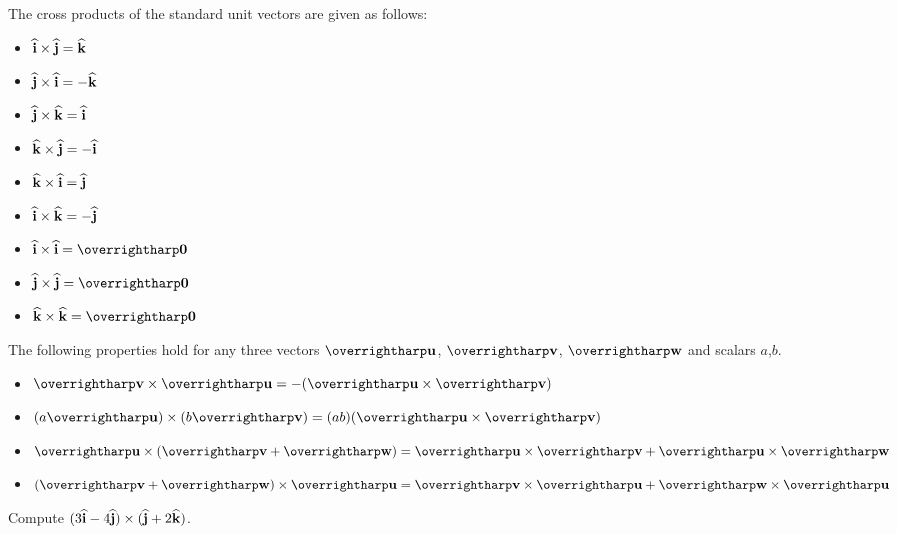 \documentclass[letterpaper, twoside, 12pt]{book}
\begin{document}
\begin{theorem}
  The cross products of the standard unit vectors are given as follows:
  \begin{itemize}
    \item $\mathbf{\widehat{i}} \times \mathbf{\widehat{j}} = \mathbf{\widehat{k}}$
    \item $\mathbf{\widehat{j}} \times \mathbf{\widehat{i}} = -\mathbf{\widehat{k}}$
    \item $\mathbf{\widehat{j}} \times \mathbf{\widehat{k}} = \mathbf{\widehat{i}}$
    \item $\mathbf{\widehat{k}} \times \mathbf{\widehat{j}} = -\mathbf{\widehat{i}}$
    \item $\mathbf{\widehat{k}} \times \mathbf{\widehat{i}} = \mathbf{\widehat{j}}$
    \item $\mathbf{\widehat{i}} \times \mathbf{\widehat{k}} = -\mathbf{\widehat{j}}$
    \item $\veci \times \veci = \harpvec 0$
    \item $\vecj \times \vecj = \harpvec 0$
    \item $\veck \times \veck = \harpvec 0$
  \end{itemize}
\end{theorem}

\begin{theorem}
  The following properties hold for any three vectors $\harpvec{u}$, $\harpvec{v}$,
  $\harpvec{w}$ and scalars $a$,$b$.
  \begin{itemize}
  \item $\harpvec{v} \times \harpvec{u} = -(\harpvec{u} \times \harpvec{v})$
  \item $(a\harpvec{u}) \times (b\harpvec{v}) = (ab)(\harpvec{u} \times \harpvec{v})$
  \item
    $\harpvec{u} \times (\harpvec{v} + \harpvec{w}) =
    \harpvec{u} \times \harpvec{v} + \harpvec{u} \times \harpvec{w}$
  \item
    $(\harpvec{v} + \harpvec{w}) \times \harpvec{u} =
    \harpvec{v} \times \harpvec{u} + \harpvec{w} \times \harpvec{u}$
  \end{itemize}
\end{theorem}

\begin{problem}
  Compute \((3\mathbf{\widehat{i}}-4\mathbf{\widehat{j}})\times(\mathbf{\widehat{j}}+2\mathbf{\widehat{k}})\).
\end{problem}
\end{document}
